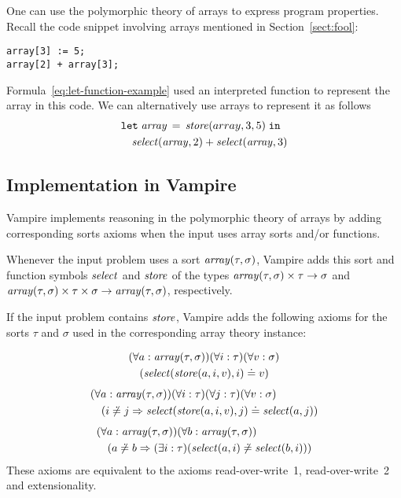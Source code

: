 One can use the polymorphic theory of arrays to express program properties. Recall the code snippet involving arrays mentioned in Section~\ref{sect:fool}:
\begin{verbatim}
array[3] := 5;
array[2] + array[3];
\end{verbatim}
Formula~\eqref{eq:let-function-example} used an interpreted function to represent the array in this code. We can alternatively use arrays to represent it as follows
\begin{equation}\label{eq:arrays-example}
\begin{aligned}
&\mathtt{let}\;{\mathit{array}}\,=\,{\mathit{store}({array},{3},{5})}\;\mathtt{in}\\
&\quad\mathit{select}({\mathit{array}},{2}) + \mathit{select}({\mathit{array}},{3})
\end{aligned}
\end{equation}

\subsection{Implementation in Vampire}

Vampire implements reasoning in the polymorphic theory of arrays by adding corresponding sorts axioms when the input uses array sorts and/or functions.

Whenever the input problem uses a sort $\mathit{array}(\tau,\sigma)$, Vampire adds this sort and function symbols $\mathit{select}$ and $\mathit{store}$ of the types $\mathit{array}(\tau,\sigma) \times \tau \to \sigma$ and $\mathit{array}(\tau,\sigma) \times \tau \times \sigma \to \mathit{array}(\tau,\sigma)$, respectively.

If the input problem contains $\mathit{store}$, Vampire adds the following axioms for the sorts $\tau$ and $\sigma$ used in the corresponding array theory instance:

\begin{equation}\label{eq:array-axiom-1}
  \begin{aligned}
    &(\forall a:\mathit{array}(\tau,\sigma))(\forall i:\tau)(\forall v:\sigma)\\
    &\quad(\mathit{select}({\mathit{store}({a},{i},{v})},{i}) \doteq v)
  \end{aligned}
\end{equation}
\begin{equation}\label{eq:array-axiom-2}
  \begin{aligned}
    &(\forall a:\mathit{array}(\tau,\sigma))(\forall i:\tau)(\forall j:\tau)(\forall v:\sigma)\\
    &\quad(i \not\doteq j \Rightarrow \mathit{select}({\mathit{store}({a},{i},{v})},{j}) \doteq \mathit{select}({a},{j}))
  \end{aligned}
\end{equation}
\begin{equation}\label{eq:array-axiom-3}
  \begin{aligned}
    &(\forall a:\mathit{array}(\tau,\sigma))(\forall b:\mathit{array}(\tau,\sigma))\\
    &\quad(a \not\doteq b \Rightarrow (\exists i:\tau)(\mathit{select}({a},{i}) \not\doteq \mathit{select}({b},{i})))
  \end{aligned}
\end{equation}
These axioms are equivalent to the axioms read-over-write~1, read-over-write~2 and extensionality.


